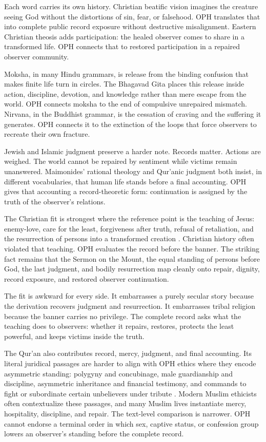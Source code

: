 \documentclass[11pt]{article}
\theoremstyle{remark}
\theoremstyle{plain}
\begin{document}
Each word carries its own history. Christian beatific vision imagines the
creature seeing God without the distortions of sin, fear, or falsehood. OPH
translates that into complete public record exposure without destructive
misalignment. Eastern Christian theosis adds participation: the healed observer
comes to share in a transformed life. OPH connects that to restored
participation in a repaired observer community.

Moksha, in many Hindu grammars, is release from the binding confusion that makes
finite life turn in circles. The Bhagavad Gita places this release inside action,
discipline, devotion, and knowledge rather than mere escape from the world. OPH
connects moksha to the end of compulsive unrepaired mismatch. Nirvana, in the
Buddhist grammar, is the cessation of craving and the suffering it generates.
OPH connects it to the extinction of the loops that force observers to recreate
their own fracture.

Jewish and Islamic judgment preserve a harder note. Records matter. Actions are
weighed. The world cannot be repaired by sentiment while victims remain
unanswered. Maimonides' rational theology and Qur'anic judgment both insist,
in different vocabularies, that human life stands before a final accounting.
OPH gives that accounting a record-theoretic form: continuation is assigned by
the truth of the observer's relations.

The Christian fit is strongest where the reference point is the teaching of
Jesus: enemy-love, care for the least, forgiveness after truth, refusal of
retaliation, and the resurrection of persons into a transformed creation
\cite{Bible}. Christian history often violated that teaching. OPH evaluates the
record before the banner. The striking fact remains that the Sermon on the Mount,
the equal standing of persons before God, the last judgment, and bodily
resurrection map cleanly onto repair, dignity, record exposure, and restored
observer continuation.

The fit is awkward for every side. It embarrasses a purely secular story because
the derivation recovers judgment and resurrection. It embarrasses tribal
religion because the banner carries no privilege. The complete record asks what
the teaching does to observers: whether it repairs, restores, protects the
least powerful, and keeps victims inside the truth.

The Qur'an also contributes record, mercy, judgment, and final accounting. Its
literal juridical passages are harder to align with OPH ethics where they encode
asymmetric standing: polygyny and concubinage, male guardianship and discipline,
asymmetric inheritance and financial testimony, and commands to fight or
subordinate certain unbelievers under tribute
\cite{Quran,Quran4304,Quran4324,Quran4334,Quran4211,Quran2282,Quran4905,Quran4929}.
Modern Muslim ethicists often contextualize these passages, and many Muslim
lives instantiate mercy, hospitality, discipline, and repair. The text-level
comparison is narrower. OPH cannot endorse a terminal order in which sex,
captive status, or confession group lowers an observer's standing before the
complete record.
\end{document}
